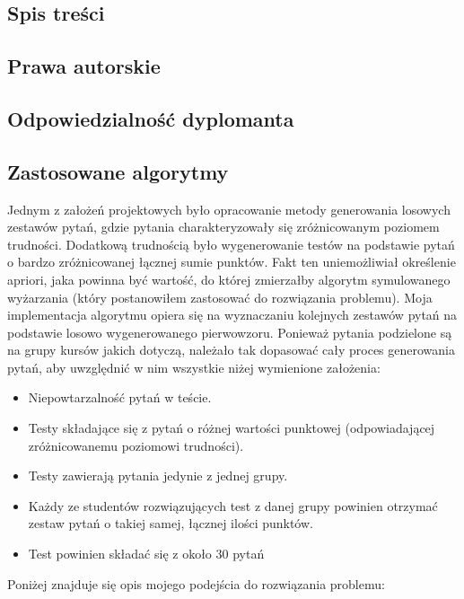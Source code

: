 \documentclass[a4paper, titlepage]{article}
\begin{document}
	\subsection{Spis treści}
	\subsection{Prawa autorskie}
	\subsection{Odpowiedzialność dyplomanta}
	\subsection{Zastosowane algorytmy}
	Jednym z założeń projektowych było opracowanie metody generowania losowych zestawów pytań, gdzie pytania charakteryzowały się zróżnicowanym poziomem trudności. Dodatkową trudnością było wygenerowanie testów na podstawie pytań o bardzo zróżnicowanej łącznej sumie punktów. Fakt ten uniemożliwiał określenie apriori, jaka powinna być wartość, do której zmierzałby algorytm symulowanego wyżarzania (który postanowiłem zastosować do rozwiązania problemu). Moja implementacja algorytmu opiera się na wyznaczaniu kolejnych zestawów pytań na podstawie losowo wygenerowanego pierwowzoru. Ponieważ pytania podzielone są na grupy kursów jakich dotyczą, należało tak dopasować cały proces generowania pytań, aby uwzględnić w nim wszystkie niżej wymienione założenia:
	\begin{itemize}
	\item Niepowtarzalność pytań w teście.
	\item Testy składające się z pytań o różnej wartości punktowej (odpowiadającej zróżnicowanemu poziomowi trudności).
	\item Testy zawierają pytania jedynie z jednej grupy.
	\item Każdy ze studentów rozwiązujących test z danej grupy powinien otrzymać zestaw pytań o takiej samej, łącznej ilości punktów.
	\item Test powinien składać się z około 30 pytań
	\end{itemize}
	
Poniżej znajduje się opis mojego podejścia do rozwiązania problemu:
\end{document}
